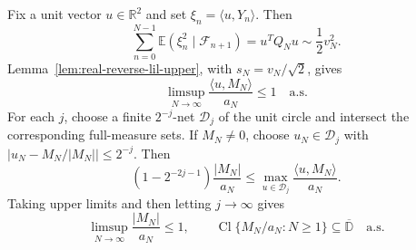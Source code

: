 \documentclass[12pt, reqno, final, a4paper]{amsart}
\theoremstyle{plain}
\theoremstyle{definition}
\theoremstyle{remark}
\DeclareMathOperator{\Cl}{Cl}
\newcommand{\E}{\mathbb E}
\newcommand{\1}{\mathbf 1}
\begin{document}
Fix a unit vector $u\in\mathbb R^2$ and set
$\xi_n=\langle u,Y_n\rangle$. Then
\[
 \sum_{n=0}^{N-1}\E(\xi_n^2\mid\mathcal F_{n+1})
 =u^TQ_Nu\sim\frac12v_N^2.
\]
Lemma~\ref{lem:real-reverse-lil-upper}, with $s_N=v_N/\sqrt2$, gives
\[
 \limsup_{N\to\infty}\frac{\langle u,M_N\rangle}{a_N}\le1
 \quad\text{a.s.}
\]
For each $j$, choose a finite $2^{-j}$-net $\mathcal D_j$ of the unit circle
and intersect the corresponding full-measure sets. If $M_N\ne0$, choose
$u_N\in\mathcal D_j$ with $|u_N-M_N/|M_N||\le2^{-j}$. Then
\[
 \left(1-2^{-2j-1}\right)\frac{|M_N|}{a_N}
 \le \max_{u\in\mathcal D_j}\frac{\langle u,M_N\rangle}{a_N}.
\]
Taking upper limits and then letting $j\to\infty$ gives
\begin{equation}\label{eq:upper-cluster-contained}
 \limsup_{N\to\infty}\frac{|M_N|}{a_N}\le1,
 \qquad
 \Cl\{M_N/a_N:N\ge1\}\subseteq\overline{\mathbb D}
 \quad\text{a.s.}
\end{equation}
\end{document}
